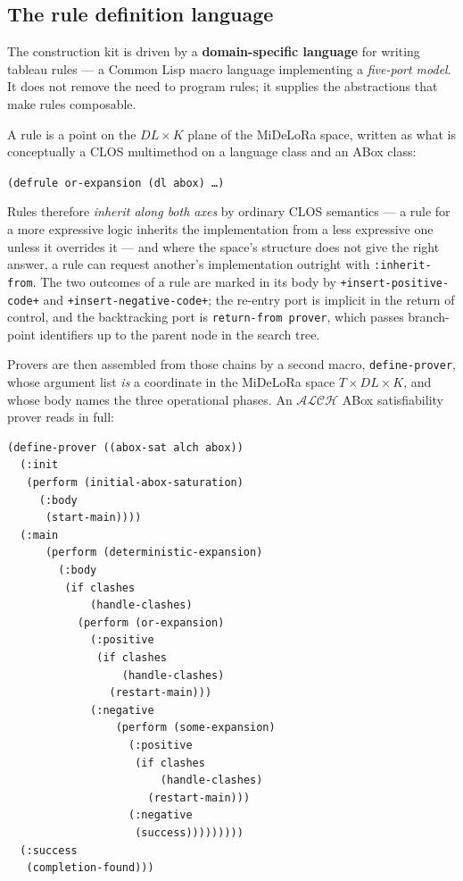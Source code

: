 \documentclass[11pt,a4paper,DIV=12,parskip=half]{scrartcl}
\begin{document}
\subsection{The rule definition language}

The construction kit is driven by a \textbf{domain-specific language} for writing
tableau rules --- a Common Lisp macro language implementing a \emph{five-port
model}. It does not remove the need to program rules; it supplies the
abstractions that make rules composable.

A rule is a point on the $DL \times K$ plane of the MiDeLoRa space, written as
what is conceptually a CLOS multimethod on a language class and an ABox class:

\begin{center}
\texttt{(defrule or-expansion (dl abox) …)}
\end{center}

Rules therefore \emph{inherit along both axes} by ordinary CLOS semantics --- a
rule for a more expressive logic inherits the implementation from a less
expressive one unless it overrides it --- and where the space's structure does not
give the right answer, a rule can request another's implementation outright with
\texttt{:inherit-from}. The two outcomes of a rule are marked in its body by
\texttt{+insert-positive-code+} and \texttt{+insert-negative-code+}; the re-entry
port is implicit in the return of control, and the backtracking port is
\texttt{return-from prover}, which passes branch-point identifiers up to the
parent node in the search tree.

Provers are then assembled from those chains by a second macro,
\texttt{define-prover}, whose argument list \emph{is} a coordinate in the
MiDeLoRa space $T \times DL \times K$, and whose body names the three operational
phases. An $\mathcal{ALCH}$ ABox satisfiability prover reads in full:

{\small
\begin{verbatim}
(define-prover ((abox-sat alch abox))
  (:init
   (perform (initial-abox-saturation)
     (:body
      (start-main))))
  (:main
      (perform (deterministic-expansion)
        (:body
         (if clashes
             (handle-clashes)
           (perform (or-expansion)
             (:positive
              (if clashes
                  (handle-clashes)
                (restart-main)))
             (:negative
                 (perform (some-expansion)
                   (:positive
                    (if clashes
                        (handle-clashes)
                      (restart-main)))
                   (:negative
                    (success)))))))))
  (:success
   (completion-found)))
\end{verbatim}
}
\end{document}
